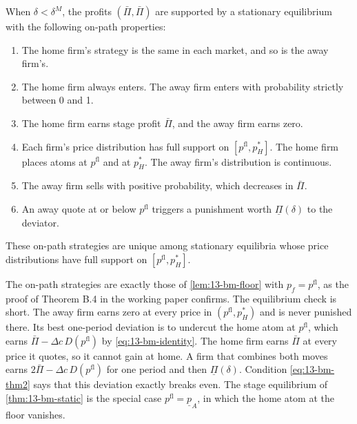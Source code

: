 \begin{theorem}\label{thm:13-bm-structure}
When $\delta<\delta^M$, the profits $(\bar\Pi,\bar\Pi)$ are supported by a stationary equilibrium with the
following on-path properties:
\begin{enumerate}[label=(\roman*)]
\item The home firm's strategy is the same in each market, and so is the away firm's.
\item The home firm always enters. The away firm enters with probability strictly between 0 and 1.
\item The home firm earns stage profit $\bar\Pi$, and the away firm earns zero.
\item Each firm's price distribution has full support on $[p^{\mathrm{fl}},p_H^*]$. The home firm places atoms
at $p^{\mathrm{fl}}$ and at $p_H^*$. The away firm's distribution is continuous.
\item The away firm sells with positive probability, which decreases in $\bar\Pi$.
\item An away quote at or below $p^{\mathrm{fl}}$ triggers a punishment worth $\underline\Pi(\delta)$ to the
deviator.
\end{enumerate}
These on-path strategies are unique among stationary equilibria whose price distributions have full support on
$[p^{\mathrm{fl}},p_H^*]$.
\end{theorem}

The on-path strategies are exactly those of \cref{lem:13-bm-floor} with $p_f=p^{\mathrm{fl}}$, as the proof
of Theorem B.4 in the working paper confirms. The equilibrium check is short. The away firm earns zero at
every price in $(p^{\mathrm{fl}},p_H^*)$ and is never punished there. Its best one-period deviation is to
undercut the home atom at $p^{\mathrm{fl}}$, which earns $\bar\Pi-\Delta c\,D(p^{\mathrm{fl}})$ by
\eqref{eq:13-bm-identity}. The home firm earns $\bar\Pi$ at every price it quotes, so it cannot gain at home.
A firm that combines both moves earns $2\bar\Pi-\Delta c\,D(p^{\mathrm{fl}})$ for one period and then
$\underline\Pi(\delta)$. Condition \eqref{eq:13-bm-thm2} says that this deviation exactly breaks even. The
stage equilibrium of \cref{thm:13-bm-static} is the special case $p^{\mathrm{fl}}=\underline p_A$, in which the
home atom at the floor vanishes.

